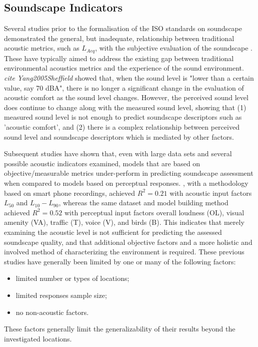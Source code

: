   \subsection{Soundscape Indicators}
    Several studies prior to the formalisation of the ISO standards on soundscape demonstrated the general, but inadequate, relationship between traditional acoustic metrics, such as $L_{Aeq}$, with the subjective evaluation of the soundscape \citep{Berglund2006Tool, Yang2005Comfort,  Aumond2017Modeling, AlsinaPages2020Perceptual}.
    These have typically aimed to address the existing gap between traditional environmental acoustics metrics and the experience of the sound environment. \emph{cite Yang2005Sheffield} showed that, when the sound level is "lower than a certain value, say 70 dBA", there is no longer a significant change in the evaluation of acoustic comfort as the sound level changes. However, the perceived sound level does continue to change along with the measured sound level, showing that (1) measured sound level is not enough to predict soundscape descriptors such as 'acoustic comfort', and (2) there is a complex relationship between perceived sound level and soundscape descriptors which is mediated by other factors.

    Subsequent studies have shown that, even with large data sets and several possible acoustic indicators examined, models that are based on objective/measurable metrics under-perform in predicting soundscape assessment when compared to models based on perceptual responses. \cite{Ricciardi2015Sound}, with a methodology based on smart phone recordings, achieved $R^2 = 0.21$ with acoustic input factors $L_50$ and $L_10-L_90$, whereas the same dataset and model building method achieved $R^2 = 0.52$ with perceptual input factors overall loudness (OL), visual amenity (VA), traffic (T), voice (V), and birds (B). This indicates that merely examining the acoustic level is not sufficient for predicting the assessed soundscape quality, and that additional objective factors and a more holistic and involved method of characterizing the environment is required. These previous studies have generally been limited by one or many of the following factors:
    \begin{itemize}
      \item limited number or types of locations;
      \item limited responses sample size;
      \item no non-acoustic factors.
    \end{itemize}
    These factors generally limit the generalizability of their results beyond the investigated locations.

